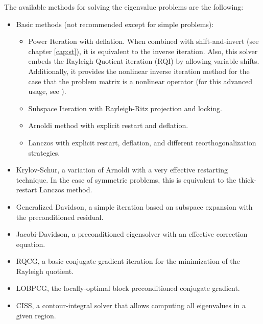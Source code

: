	The available methods for solving the eigenvalue problems are the following:
\begin{itemize}
\setlength{\itemsep}{0pt}
\item Basic methods (not recommended except for simple problems):
\begin{itemize}
\setlength{\itemsep}{-1pt}
\item Power Iteration with deflation. When combined with shift-and-invert (see chapter \ref{cap:st}), it is equivalent to the inverse iteration. Also, this solver embeds the Rayleigh Quotient iteration (RQI) by allowing variable shifts. Additionally, it provides the nonlinear inverse iteration method for the case that the problem matrix is a nonlinear operator (for this advanced usage, see ).
\item Subspace Iteration with Rayleigh-Ritz projection and locking.
\item Arnoldi method with explicit restart and deflation.
\item Lanczos with explicit restart, deflation, and different reorthogonalization strategies.
\end{itemize}
\item Krylov-Schur, a variation of Arnoldi with a very effective restarting technique. In the case of symmetric problems, this is equivalent to the thick-restart Lanczos method.
\item Generalized Davidson, a simple iteration based on subspace expansion with the preconditioned residual.
\item Jacobi-Davidson, a preconditioned eigensolver with an effective correction equation.
\item RQCG, a basic conjugate gradient iteration for the minimization of the Rayleigh quotient.
\item LOBPCG, the locally-optimal block preconditioned conjugate gradient.
\item CISS, a contour-integral solver that allows computing all eigenvalues in a given region.
\end{itemize}


